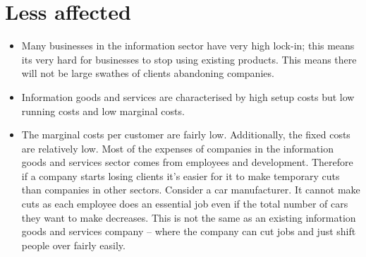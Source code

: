 \documentclass[10pt, a4paper]{article}
\begin{document}
\section*{Less affected}

\begin{itemize}

\item Many businesses in the information sector have very high lock-in; this
means its very hard for businesses to stop using existing products. This
means there will not be large swathes of clients abandoning companies.

\item Information goods and services are characterised by high setup costs but
low running costs and low marginal costs.

\item The marginal costs per customer are fairly low. Additionally, the
fixed costs are relatively low. Most of the expenses of companies in the
information goods and services sector comes from employees
and development. Therefore if a company starts losing clients it's easier
for it to make temporary cuts than companies in other sectors. Consider a
car manufacturer. It cannot make cuts as each employee does an essential job
even if the total number of cars they want to make decreases. This is not
the same as an existing information goods and services company -- where the
company can cut jobs and just shift people over fairly easily.

\end{itemize}
\end{document}
